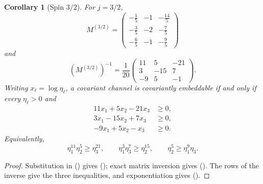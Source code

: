 \documentclass[twoside,10pt]{article}
\numberwithin{equation}{section}
\theoremstyle{slbody}
\newtheorem{corollary}[theorem]{Corollary}
\theoremstyle{definition}
\theoremstyle{remark}
\renewcommand{\eqref}[1]{%
  \textup{{\normalfont(\oldstylenums{\ref{#1}}}\normalfont)}}
\begin{document}
\begin{corollary}[Spin \(3/2\)]\label{cor:spin-three-halves}
For \(j=3/2\),
\begin{equation}\label{eq:M-spin-three-halves}
 M^{(3/2)}=
 \begin{pmatrix}
 -\tfrac15&-1&-\tfrac{14}5\\
 -\tfrac35&-2&-\tfrac75\\
 -\tfrac65&-1&-\tfrac95
 \end{pmatrix}
\end{equation}
and
\begin{equation}\label{eq:Minv-spin-three-halves}
 (M^{(3/2)})^{-1}=\frac1{20}
 \begin{pmatrix}
 11&5&-21\\
 3&-15&7\\
 -9&5&-1
 \end{pmatrix}.
\end{equation}
Writing \(x_\ell=\log\eta_\ell\), a covariant channel is covariantly
embeddable if and only if every \(\eta_\ell>0\) and
\begin{align}
 11x_1+5x_2-21x_3&\geq0,                                      \label{eq:spin-three-halves-facet-one}\\
 3x_1-15x_2+7x_3&\geq0,                                      \label{eq:spin-three-halves-facet-two}\\
 -9x_1+5x_2-x_3&\geq0.                                      \label{eq:spin-three-halves-facet-three}
\end{align}
Equivalently,
\begin{equation}\label{eq:spin-three-halves-multiplicative}
 \eta_1^{11}\eta_2^5\geq\eta_3^{21},\qquad
 \eta_1^3\eta_3^7\geq\eta_2^{15},\qquad
 \eta_2^5\geq\eta_1^9\eta_3.
\end{equation}
\end{corollary}

\begin{proof}
Substitution in \eqref{eq:M-definition} gives
\eqref{eq:M-spin-three-halves}; exact matrix inversion gives
\eqref{eq:Minv-spin-three-halves}.  The rows of the inverse give the
three inequalities, and exponentiation gives
\eqref{eq:spin-three-halves-multiplicative}.
\end{proof}
\end{document}
